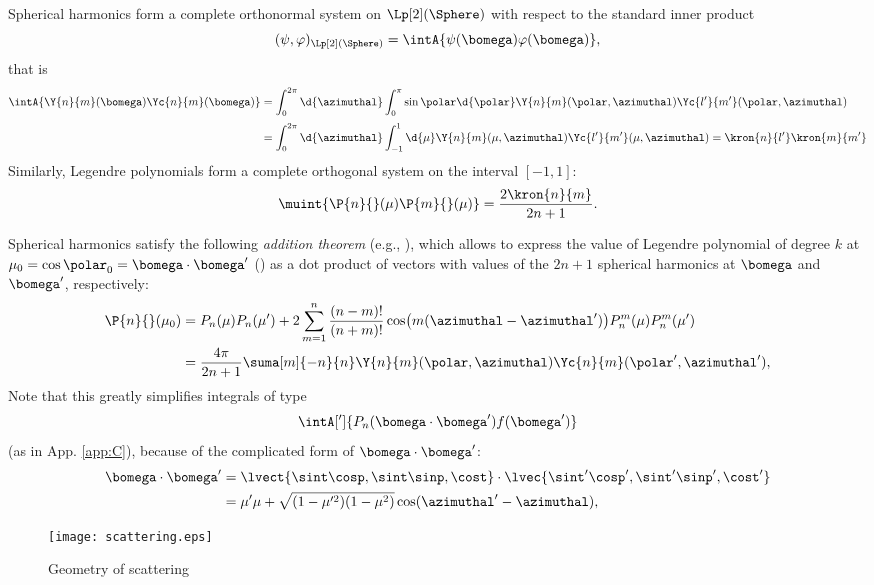 Spherical harmonics form a complete orthonormal system on $\Lp[2](\Sphere)$ with respect to the
standard inner product $$
(\psi, \varphi)_{\Lp[2](\Sphere)} = \intA{\psi(\bomega) {\varphi(\bomega)}},
$$
that is
\begin{equation}\label{eq:og}
\begin{aligned}
\intA{\Y{n}{m}(\bomega)\Yc{n}{m}(\bomega)} &=
\int_{0}^{2\pi}\d{\azimuthal}\int_{0}^{\pi}\sin\polar\d{\polar}  
\Y{n}{m}(\polar,\azimuthal)\Yc{l'}{m'}(\polar,\azimuthal)\\[.25em]
& = \int_{0}^{2\pi}\d{\azimuthal}\int_{-1}^{1}\d{\mu}
\Y{n}{m}(\mu,\azimuthal)\Yc{l'}{m'}(\mu,\azimuthal) = \kron{n}{l'}\kron{m}{m'}
\end{aligned}
\end{equation}
Similarly, Legendre polynomials form a complete orthogonal system on the interval $[-1,1]$:
$$
	\muint {\P{n}{}(\mu)\P{m}{}(\mu)} = \frac{2\kron{n}{m}}{2n + 1}.
$$

Spherical harmonics satisfy the
following \textit{addition theorem} (e.g., \cite[Remark 3.88]{Schreiner}), which allows to express the value of Legendre
polynomial of degree $k$ at $\mu_0 = \cos\polar_0 = \bomega\cdot\bomega'$ () as a dot product of
vectors with values of the $2n+1$ spherical harmonics at $\bomega$ and $\bomega'$, respectively:
\begin{align}
\P{n}{}(\mu_0)
&=P_n(\mu) P_n(\mu')+2 \sum _{m = 1}^n \frac{(n-m)!}{(n+m)!} \cos \bigl(m(\azimuthal - \azimuthal')\bigr) P_n^m(\mu) P_n^m(\mu')\nonumber\\
&=\frac{4\pi}{2n+1}\suma[m]{-n}{n}\Y{n}{m}(\polar,\azimuthal)\Yc{n}{m}(\polar',\azimuthal'),
\label{eq:additionThm}
\end{align}
Note that this greatly simplifies integrals of type
$$
\intA[']{P_n(\bomega\cdot\bomega')f(\bomega')}
$$
(as in App. \ref{app:C}), because of the complicated form of $\bomega\cdot\bomega'$:
$$
\begin{aligned}
	\bomega\cdot\bomega' 
&= \lvect{\sint\cosp,\sint\sinp,\cost} \cdot \lvec{\sint'\cosp',\sint'\sinp',\cost'} \\
& = \mu'\mu + \sqrt{(1-\mu'^2)(1-\mu^2)}\cos(\azimuthal' - \azimuthal),
\end{aligned}
$$
\begin{figure}[!hbt]
    \centering
    \texttt{[image: scattering.eps]}
    \caption[Scattering]{Geometry of scattering}
    \label{fig:scatter}
\end{figure}

